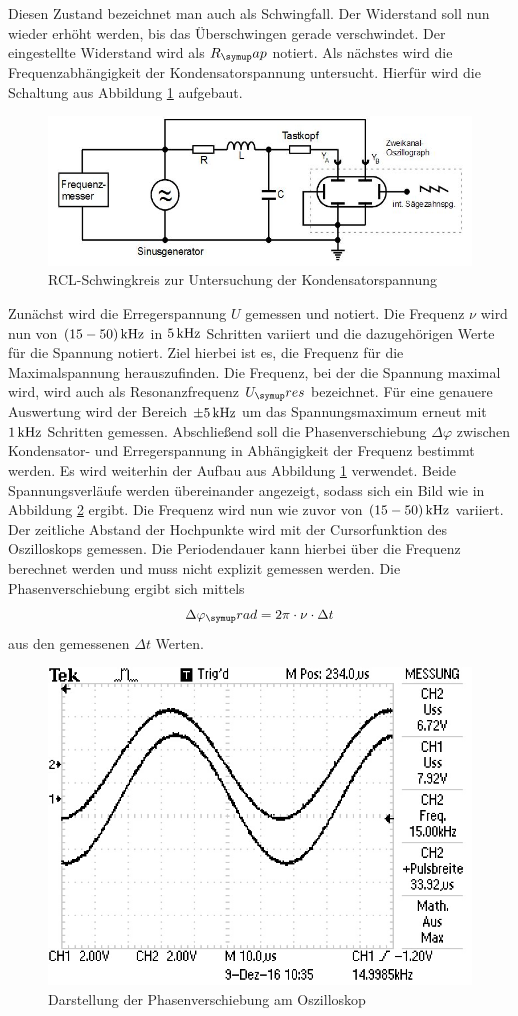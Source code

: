 Diesen Zustand bezeichnet man auch als Schwingfall. Der Widerstand soll nun
wieder erhöht werden, bis das Überschwingen gerade verschwindet. Der eingestellte
Widerstand wird als $R_\su{ap}$ notiert.
\newpage
Als nächstes wird die Frequenzabhängigkeit der Kondensatorspannung untersucht.
Hierfür wird die Schaltung aus Abbildung \ref{fig:phaseschlt} aufgebaut.
\begin{figure}[h]
  \centering
  \includegraphics[width=\textwidth]{Bilder/Phaseschalt.JPG}
  \caption{RCL-Schwingkreis zur Untersuchung der Kondensatorspannung\,\cite{354}}
  \label{fig:phaseschlt}
\end{figure}
Zunächst wird die Erregerspannung $U$ gemessen und notiert. Die Frequenz $\nu$
wird nun von $(15-50)\,\si{\kilo\hertz}$ in $5\,\si{\kilo\hertz}$ Schritten variiert und die dazugehörigen
Werte für die Spannung notiert. Ziel hierbei ist es, die Frequenz für die
Maximalspannung herauszufinden. Die Frequenz, bei der die Spannung maximal wird,
wird auch als Resonanzfrequenz $U_\su{res}$ bezeichnet. Für eine genauere
Auswertung wird der Bereich $\pm 5\,\si{\kilo\hertz}$ um das Spannungsmaximum erneut mit $1\,\si{\kilo\hertz}$
Schritten gemessen.
Abschließend soll die Phasenverschiebung $\Delta\varphi$ zwischen
Kondensator- und Erregerspannung in Abhängigkeit der Frequenz
bestimmt werden. Es wird weiterhin der Aufbau aus Abbildung
\ref{fig:phaseschlt} verwendet. Beide Spannungsverläufe werden übereinander
angezeigt, sodass sich ein Bild wie in Abbildung \ref{fig:dphi} ergibt. Die
Frequenz wird nun wie zuvor von $(15-50)\,\si{\kilo\hertz}$ variiert. Der zeitliche Abstand
der Hochpunkte wird mit der Cursorfunktion des Oszilloskops gemessen. Die
Periodendauer kann hierbei über die Frequenz berechnet werden und muss nicht
explizit gemessen werden. Die Phasenverschiebung ergibt sich mittels
\begin{equation}
  \Delta\varphi_\su{rad} = 2\pi \cdot \nu \cdot \Delta t
\end{equation}
aus den gemessenen $\Delta t$ Werten.
\begin{figure}
  \centering
  \includegraphics[angle=90]{Bilder/dphi.JPG}
  \caption{Darstellung der Phasenverschiebung am Oszilloskop}
  \label{fig:dphi}
\end{figure}
